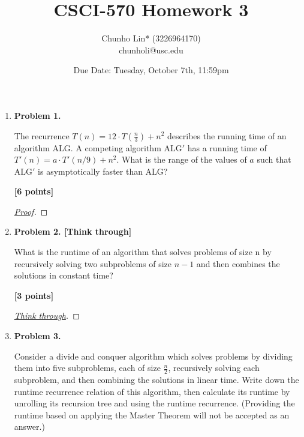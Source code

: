 \documentclass[11pt]{article}
\author{Chunho Lin* (3226964170)\\chunholi@usc.edu}
\title{CSCI-570 Homework 3}
\date{Due Date: Tuesday, October 7th, 11:59pm}
\begin{document}
\maketitle

\medskip

\begin{enumerate}

\item \textbf{Problem 1.}

The recurrence \(T (n) = 12 \cdot T (\frac{n}{3}) + n^2\) describes the running time of an algorithm ALG. A competing algorithm \(\text{ALG}'\) has a running time of \(T '(n) = a \cdot T '(n/9) + n^2\). What is the range of the values of \(a\) such that \(\text{ALG}'\) is asymptotically faster than ALG?

\begin{flushright}
\textbf{[6 points]}
\end{flushright}

\begin{proof}[\underline{Proof}]


\end{proof}


\item \textbf{Problem 2. [Think through]}

What is the runtime of an algorithm that solves problems of size n by recursively solving two subproblems of size \(n - 1\) and then combines the solutions in constant time?

\begin{flushright}
\textbf{[3 points]}
\end{flushright}

\begin{proof}[\underline{Think through}]

\end{proof}


\item \textbf{Problem 3.}

Consider a divide and conquer algorithm which solves problems by dividing them into five subproblems, each of size \(\frac{n}{2}\), recursively solving each subproblem, and then combining the solutions in linear time. Write down the runtime recurrence relation of this algorithm, then calculate its runtime by unrolling its recursion tree and using the runtime recurrence.  (Providing the runtime based on applying the Master Theorem will not be accepted as an answer.)


\end{enumerate}
\end{document}
